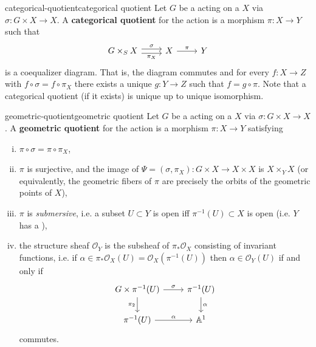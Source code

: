 \begin{topic}{categorical-quotient}{categorical quotient}
    Let $G$ be a  acting on a  $X$ via $\sigma : G \times X \to X$. A \textbf{categorical quotient} for the action is a morphism $\pi : X \to Y$ such that
    \[ \begin{tikzcd} G \times_S X \arrow[shift left=0.25em]{r}{\sigma} \arrow[swap,shift right=0.25em]{r}{\pi_X} & X \arrow{r}{\pi} & Y \end{tikzcd} \]
    is a coequalizer diagram. That is, the diagram commutes and for every $f : X \to Z$ with $f \circ \sigma = f \circ \pi_X$ there exists a unique $g : Y \to Z$ such that $f = g \circ \pi$. Note that a categorical quotient (if it exists) is unique up to unique isomorphism.
\end{topic}

\begin{topic}{geometric-quotient}{geometric quotient}
    Let $G$ be a  acting on a  $X$ via $\sigma : G \times X \to X$. A \textbf{geometric quotient} for the action is a morphism $\pi : X \to Y$ satisfying
    \begin{enumerate}[(i)]
        \item $\pi \circ \sigma = \pi \circ \pi_X$,
        \item $\pi$ is surjective, and the image of $\Psi = (\sigma, \pi_X) : G \times X \to X \times X$ is $X \times_Y X$ (or equivalently, the geometric fibers of $\pi$ are precisely the orbits of the geometric points of $X$),
        \item $\pi$ is \textit{submersive}, i.e. a subset $U \subset Y$ is open iff $\pi^{-1}(U) \subset X$ is open (i.e. $Y$ has a ),
        \item the structure sheaf $\mathcal{O}_Y$ is the subsheaf of $\pi_* \mathcal{O}_X$ consisting of invariant functions, i.e. if $\alpha \in \pi_* \mathcal{O}_X(U) = \mathcal{O}_X(\pi^{-1}(U))$ then $\alpha \in \mathcal{O}_Y(U)$ if and only if
        \[ \begin{tikzcd} G \times \pi^{-1}(U) \arrow{r}{\sigma} \arrow[swap]{d}{\pi_2} & \pi^{-1}(U) \arrow{d}{\alpha} \\ \pi^{-1}(U) \arrow{r}{\alpha} & \AA^1 \end{tikzcd} \]
        commutes.
    \end{enumerate}
\end{topic}

